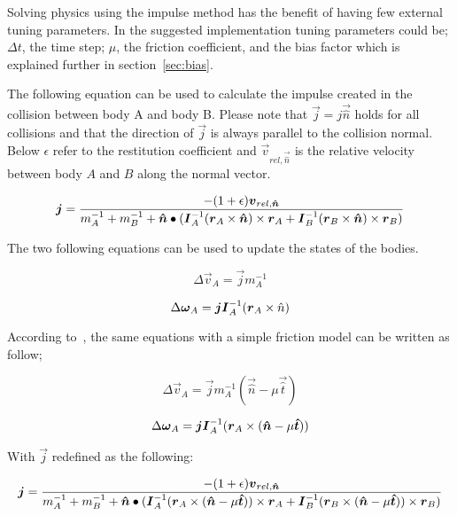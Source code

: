 Solving physics using the impulse method has the benefit of having few external tuning
parameters. In the suggested implementation tuning parameters could be; $\Delta t$, the time step;
$\mu$, the friction coefficient, and the bias factor which is explained further in section~\ref{sec:bias}.

The following equation can be used to calculate the impulse created in the
collision between body A and body B.
Please note that $\vec{j} = j\vec{\hat{n}}$ holds for all collisions and that the direction
of $\vec{j}$ is always parallel to the collision normal. Below $\epsilon$ refer to the
restitution coefficient and $\vec{v}_{rel,\vec{\hat{n}}}$ is the relative velocity
between body $A$ and $B$ along the normal vector.

\begin{equation}
  \boldsymbol{j} = \frac{-(1+\epsilon)\boldsymbol{v}_{rel,\boldsymbol{\hat{n}}}}
  {m_A^{-1}+m_B^{-1}+\boldsymbol{\hat{n}}\bullet(\boldsymbol{I}_A^{-1}(\boldsymbol{r}_A\times\boldsymbol{\hat{n}})\times\boldsymbol{r}_A
  +\boldsymbol{I}_B^{-1}(\boldsymbol{r}_B\times\boldsymbol{\hat{n}})\times\boldsymbol{r}_B)}
\end{equation}

The two following equations can be used to update the states of the bodies.

\begin{equation}
  \Delta\vec{v}_A = \vec{j}m_A^{-1}
\end{equation}

\begin{equation}
  \Delta\boldsymbol{\omega}_A = \boldsymbol{j}\boldsymbol{I}_A^{-1}(\boldsymbol{r}_A\times\hat{n})
\end{equation}

According to~\cite{hansson}, the same equations with a simple friction model can
be written as follow;

\begin{equation}
  \Delta\vec{v}_A = \vec{j}m_A^{-1}(\vec{\hat{n}} - \mu\vec{\hat{t}})
\end{equation}

\begin{equation}
  \Delta\boldsymbol{\omega}_A = \boldsymbol{j}\boldsymbol{I}_A^{-1}(\boldsymbol{r}_A\times(\boldsymbol{\hat{n}}-\mu\boldsymbol{\hat{t}}))
\end{equation}

With $\vec{j}$ redefined as the following:

\begin{equation}\label{eq:j}
  \boldsymbol{j} = \frac{-(1+\epsilon)\boldsymbol{v}_{rel,\boldsymbol{\hat{n}}}}
  {m_A^{-1}+m_B^{-1}+\boldsymbol{\hat{n}}\bullet(\boldsymbol{I}_A^{-1}(\boldsymbol{r}_A\times(\boldsymbol{\hat{n}}-\mu\boldsymbol{\hat{t}}))\times\boldsymbol{r}_A
  +\boldsymbol{I}_B^{-1}(\boldsymbol{r}_B\times(\boldsymbol{\hat{n}}-\mu\boldsymbol{\hat{t}}))\times\boldsymbol{r}_B)}
\end{equation}

